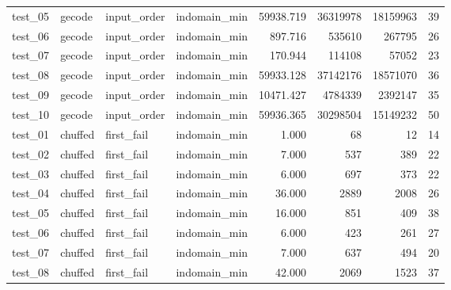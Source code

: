 \begin{longtable}{l l l l r r r r}
    test\_05         & gecode          & input\_order      & indomain\_min     & 59938.719          & 36319978       & 18159963          & 39             \\
    test\_06         & gecode          & input\_order      & indomain\_min     & 897.716            & 535610         & 267795            & 26             \\
    test\_07         & gecode          & input\_order      & indomain\_min     & 170.944            & 114108         & 57052             & 23             \\
    test\_08         & gecode          & input\_order      & indomain\_min     & 59933.128          & 37142176       & 18571070          & 36             \\
    test\_09         & gecode          & input\_order      & indomain\_min     & 10471.427          & 4784339        & 2392147           & 35             \\
    test\_10         & gecode          & input\_order      & indomain\_min     & 59936.365          & 30298504       & 15149232          & 50             \\
    \midrule
    test\_01         & chuffed         & first\_fail       & indomain\_min     & 1.000              & 68             & 12                & 14             \\
    test\_02         & chuffed         & first\_fail       & indomain\_min     & 7.000              & 537            & 389               & 22             \\
    test\_03         & chuffed         & first\_fail       & indomain\_min     & 6.000              & 697            & 373               & 22             \\
    test\_04         & chuffed         & first\_fail       & indomain\_min     & 36.000             & 2889           & 2008              & 26             \\
    test\_05         & chuffed         & first\_fail       & indomain\_min     & 16.000             & 851            & 409               & 38             \\
    test\_06         & chuffed         & first\_fail       & indomain\_min     & 6.000              & 423            & 261               & 27             \\
    test\_07         & chuffed         & first\_fail       & indomain\_min     & 7.000              & 637            & 494               & 20             \\
    test\_08         & chuffed         & first\_fail       & indomain\_min     & 42.000             & 2069           & 1523              & 37             \\

\end{longtable}
